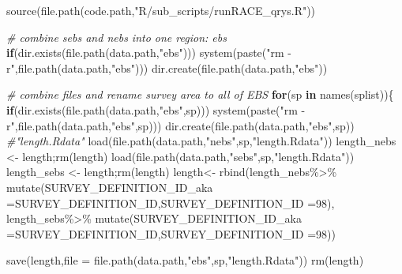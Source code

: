 \documentclass[
]{article}
\newenvironment{Shaded}{\begin{snugshade}}{\end{snugshade}}
\newcommand{\AttributeTok}[1]{\textcolor[rgb]{0.77,0.63,0.00}{#1}}
\newcommand{\CommentTok}[1]{\textcolor[rgb]{0.56,0.35,0.01}{\textit{#1}}}
\newcommand{\ControlFlowTok}[1]{\textcolor[rgb]{0.13,0.29,0.53}{\textbf{#1}}}
\newcommand{\DecValTok}[1]{\textcolor[rgb]{0.00,0.00,0.81}{#1}}
\newcommand{\FunctionTok}[1]{\textcolor[rgb]{0.00,0.00,0.00}{#1}}
\newcommand{\NormalTok}[1]{#1}
\newcommand{\OtherTok}[1]{\textcolor[rgb]{0.56,0.35,0.01}{#1}}
\newcommand{\SpecialCharTok}[1]{\textcolor[rgb]{0.00,0.00,0.00}{#1}}
\newcommand{\StringTok}[1]{\textcolor[rgb]{0.31,0.60,0.02}{#1}}
\begin{document}
\begin{Shaded}
\begin{Highlighting}[]
  \FunctionTok{source}\NormalTok{(}\FunctionTok{file.path}\NormalTok{(code.path,}\StringTok{"R/sub\_scripts/runRACE\_qrys.R"}\NormalTok{))}

  \CommentTok{\# combine sebs and nebs into one region: ebs}
  \ControlFlowTok{if}\NormalTok{(}\FunctionTok{dir.exists}\NormalTok{(}\FunctionTok{file.path}\NormalTok{(data.path,}\StringTok{"ebs"}\NormalTok{)))}
      \FunctionTok{system}\NormalTok{(}\FunctionTok{paste}\NormalTok{(}\StringTok{"rm {-}r"}\NormalTok{,}\FunctionTok{file.path}\NormalTok{(data.path,}\StringTok{"ebs"}\NormalTok{)))}
    \FunctionTok{dir.create}\NormalTok{(}\FunctionTok{file.path}\NormalTok{(data.path,}\StringTok{"ebs"}\NormalTok{))}
  
  \CommentTok{\# combine files and rename survey area to all of EBS}
  \ControlFlowTok{for}\NormalTok{(sp }\ControlFlowTok{in} \FunctionTok{names}\NormalTok{(splist))\{}
    \ControlFlowTok{if}\NormalTok{(}\FunctionTok{dir.exists}\NormalTok{(}\FunctionTok{file.path}\NormalTok{(data.path,}\StringTok{"ebs"}\NormalTok{,sp)))}
      \FunctionTok{system}\NormalTok{(}\FunctionTok{paste}\NormalTok{(}\StringTok{"rm {-}r"}\NormalTok{,}\FunctionTok{file.path}\NormalTok{(data.path,}\StringTok{"ebs"}\NormalTok{,sp)))}
      \FunctionTok{dir.create}\NormalTok{(}\FunctionTok{file.path}\NormalTok{(data.path,}\StringTok{"ebs"}\NormalTok{,sp))}
    \CommentTok{\#"length.Rdata"         }
    \FunctionTok{load}\NormalTok{(}\FunctionTok{file.path}\NormalTok{(data.path,}\StringTok{"nebs"}\NormalTok{,sp,}\StringTok{"length.Rdata"}\NormalTok{))}
\NormalTok{    length\_nebs }\OtherTok{\textless{}{-}}\NormalTok{ length;}\FunctionTok{rm}\NormalTok{(length)}
    \FunctionTok{load}\NormalTok{(}\FunctionTok{file.path}\NormalTok{(data.path,}\StringTok{"sebs"}\NormalTok{,sp,}\StringTok{"length.Rdata"}\NormalTok{))}
\NormalTok{    length\_sebs }\OtherTok{\textless{}{-}}\NormalTok{ length;}\FunctionTok{rm}\NormalTok{(length)}
\NormalTok{    length}\OtherTok{\textless{}{-}} \FunctionTok{rbind}\NormalTok{(length\_nebs}\SpecialCharTok{\%\textgreater{}\%}
      \FunctionTok{mutate}\NormalTok{(}\AttributeTok{SURVEY\_DEFINITION\_ID\_aka =}\NormalTok{SURVEY\_DEFINITION\_ID,}\AttributeTok{SURVEY\_DEFINITION\_ID =}\DecValTok{98}\NormalTok{),}
\NormalTok{     length\_sebs}\SpecialCharTok{\%\textgreater{}\%}
      \FunctionTok{mutate}\NormalTok{(}\AttributeTok{SURVEY\_DEFINITION\_ID\_aka =}\NormalTok{SURVEY\_DEFINITION\_ID,}\AttributeTok{SURVEY\_DEFINITION\_ID =}\DecValTok{98}\NormalTok{))}
    
    \FunctionTok{save}\NormalTok{(length,}\AttributeTok{file =} \FunctionTok{file.path}\NormalTok{(data.path,}\StringTok{"ebs"}\NormalTok{,sp,}\StringTok{"length.Rdata"}\NormalTok{))}
    \FunctionTok{rm}\NormalTok{(length)}
    

\end{Highlighting}
\end{Shaded}
\end{document}
